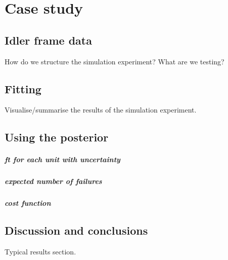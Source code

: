 \chapter{Case study}\label{chap:chapter3}


\section{Idler frame data}

How do we structure the simulation experiment? What are we testing?

\section{Fitting}

Visualise/summarise the results of the simulation experiment.

\section{Using the posterior}

\paragraph*{ft for each unit with uncertainty}

\paragraph*{expected number of failures}

\paragraph*{cost function}

\section{Discussion and conclusions}

Typical results section.
